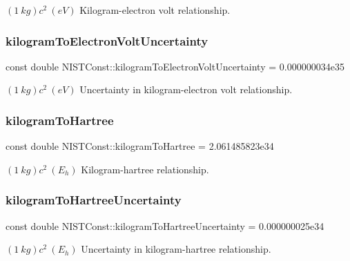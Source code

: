 $(1\ kg)c^2 \ (eV)$ Kilogram-\/electron volt relationship. \mbox{\label{group___kilogram_ga1bc5e8f6c0c532f454e143a589a532dc}} 
\subsubsection{\texorpdfstring{kilogram\+To\+Electron\+Volt\+Uncertainty}{kilogramToElectronVoltUncertainty}}
{\footnotesize\ttfamily const double N\+I\+S\+T\+Const\+::kilogram\+To\+Electron\+Volt\+Uncertainty = 0.\+000000034e35}

$(1\ kg)c^2 \ (eV)$ Uncertainty in kilogram-\/electron volt relationship. \mbox{\label{group___kilogram_gaa1f73e0db10cccf2a4c86dbd360e49a8}} 
\subsubsection{\texorpdfstring{kilogram\+To\+Hartree}{kilogramToHartree}}
{\footnotesize\ttfamily const double N\+I\+S\+T\+Const\+::kilogram\+To\+Hartree = 2.\+061485823e34}

$(1\ kg)c^2 \ (E_h)$ Kilogram-\/hartree relationship. \mbox{\label{group___kilogram_ga62cf42463d1d0306ae8656649434be2b}} 
\subsubsection{\texorpdfstring{kilogram\+To\+Hartree\+Uncertainty}{kilogramToHartreeUncertainty}}
{\footnotesize\ttfamily const double N\+I\+S\+T\+Const\+::kilogram\+To\+Hartree\+Uncertainty = 0.\+000000025e34}

$(1\ kg)c^2 \ (E_h)$ Uncertainty in kilogram-\/hartree relationship. \mbox{\label{group___kilogram_gaf543ce948a71df1884a8f240106c3c33}} 
